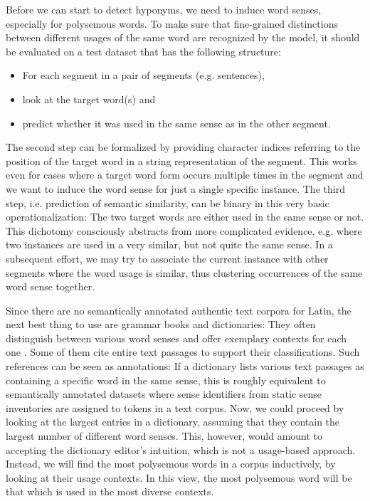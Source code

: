 Before we can start to detect hyponyms, we need to induce word senses, especially for polysemous words. To make sure that fine-grained distinctions between different usages of the same word are recognized by the model, it should be evaluated on a test dataset that has the following structure:
\begin{itemize}
	\item For each segment in a pair of segments (e.g. sentences),
	\item look at the target word(s) and
	\item predict whether it was used in the same sense as in the other segment.
\end{itemize}
The second step can be formalized by providing character indices referring to the position of the target word in a string representation of the segment. This works even for cases where a target word form occurs multiple times in the segment and we want to induce the word sense for just a single specific instance. The third step, i.e. prediction of semantic similarity, can be binary in this very basic operationalization: The two target words are either used in the same sense or not. This dichotomy consciously abstracts from more complicated evidence, e.g. where two instances are used in a very similar, but not quite the same sense. In a subsequent effort, we may try to associate the current instance with other segments where the word usage is similar, thus clustering occurrences of the same word sense together. 

Since there are no semantically annotated authentic text corpora for Latin, the next best thing to use are grammar books and dictionaries: They often distinguish between various word senses and offer exemplary contexts for each one \parencites{georgesAusfuhrlichesLateinischDeutschesHandworterbuch1913}{niederauNavigiumLateinDeutschWorterbuch2012}. Some of them cite entire text passages \parencites{shortLatinDictionary1879}{kuhnerAusfuhrlicheGrammatikLateinischen1914}{mengeLehrbuchLateinischenSyntax2009} to support their classifications. Such references can be seen as annotations: If a dictionary lists various text passages as containing a specific word in the same sense, this is roughly equivalent to semantically annotated datasets where sense identifiers from static sense inventories are assigned to tokens in a text corpus. Now, we could proceed by looking at the largest entries in a dictionary, assuming that they contain the largest number of different word senses. This, however, would amount to accepting the dictionary editor's intuition, which is not a usage-based approach. Instead, we will find the most polysemous words in a corpus inductively, by looking at their usage contexts. In this view, the most polysemous word will be that which is used in the most diverse contexts.

